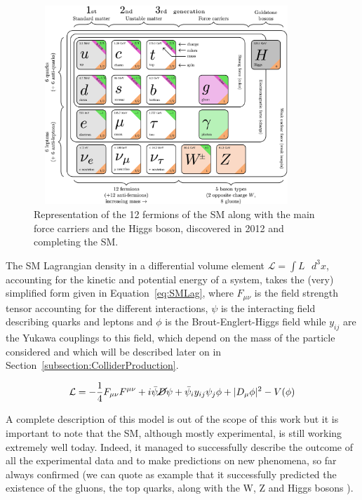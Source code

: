 \documentclass[a4paper, 10pt, openright]{report}
\begin{document}
\begin{figure}[htbp]
\begin{center}
\includegraphics[width=10cm, height=7.5cm]{figs/SMFermions.png}
\caption{Representation of the 12 fermions of the \ac{SM} \cite{SMFermions} along with the main force carriers and the Higgs boson, discovered in 2012 and completing the \ac{SM}.}
\label{figure:SMFermions}
\end{center}
\end{figure}

The \ac{SM} Lagrangian density in a differential volume element $\mathcal{L} = \int L \text{ } d^3x$, accounting for the kinetic and potential energy of a system, takes the (very) simplified form given in Equation~\ref{eq:SMLag}, where $F_{\mu \nu}$ is the field strength tensor accounting for the different interactions, $\psi$ is the interacting field describing quarks and leptons and $\phi$ is the Brout-Englert-Higgs field while $y_{ij}$ are the Yukawa couplings to this field, which depend on the mass of the particle considered and which will be described later on in Section~\ref{subsection:ColliderProduction}.

\begin{equation}
\mathcal{L} = - \frac{1}{4} F_{\mu \nu} F^{\mu \nu} + i \bar{\psi} \cancel{D} \psi + \bar{\psi}_i y_{ij} \psi_j \phi + |D_\mu \phi|^2 - V(\phi)
\label{eq:SMLag}
\end{equation}

A complete description of this model is out of the scope of this work but it is important to note that the \ac{SM}, although mostly experimental, is still working extremely well today. Indeed, it managed to successfully describe the outcome of all the experimental data and to make predictions on new phenomena, so far always confirmed (we can quote as example that it successfully predicted the existence of the gluons, the top quarks, along with the W, Z and Higgs bosons \cite{SMPredictions}).
\end{document}
